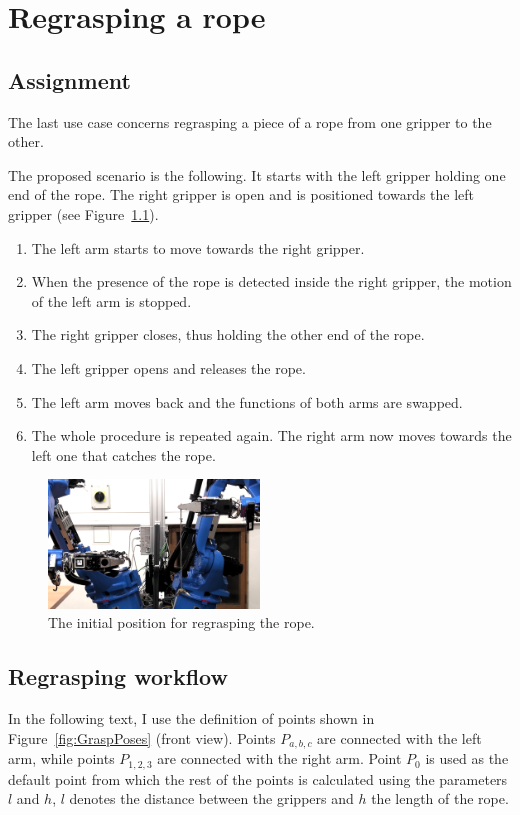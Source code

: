 \graphicspath{{Img/regrasping/}}

\chapter{Regrasping a rope}

    \section{Assignment}
        The last use case concerns regrasping a piece of a rope from one gripper to the other.

        The proposed scenario is the following.  It starts with the left gripper holding one end of the rope. The right gripper is open and is positioned towards the left gripper (see Figure~\ref{fig:RegraspInit}).
%
        \begin{enumerate}\itemsep0pt
            \item The left arm starts to move towards the right gripper.
            \item When the presence of the rope is detected inside the right gripper, the motion of the left arm is stopped.
            \item The right gripper closes, thus holding the other end of the rope.
            \item The left gripper opens and releases the rope.
            \item The left arm moves back and the functions of both arms are swapped.
            \item The whole procedure is repeated again. The right arm now moves towards the left one that catches the rope.
        \end{enumerate}

        \begin{figure}[h]
        \includegraphics[width=0.5\textwidth]{RegraspInit.png}
        \centering
        \caption{The initial position for regrasping the rope.}
        \label{fig:RegraspInit}
        \end{figure}

    \section{Regrasping workflow}
        In the following text, I use the definition of points shown in Figure~\ref{fig:GraspPoses} (front view). Points $P_{a,b,c}$ are connected with the left arm, while points $P_{1,2,3}$ are connected with the right arm. Point $P_0$ is used as the default point from which the rest of the points is calculated using the parameters $l$ and $h$, $l$ denotes the distance between the grippers and $h$ the length of the rope.


